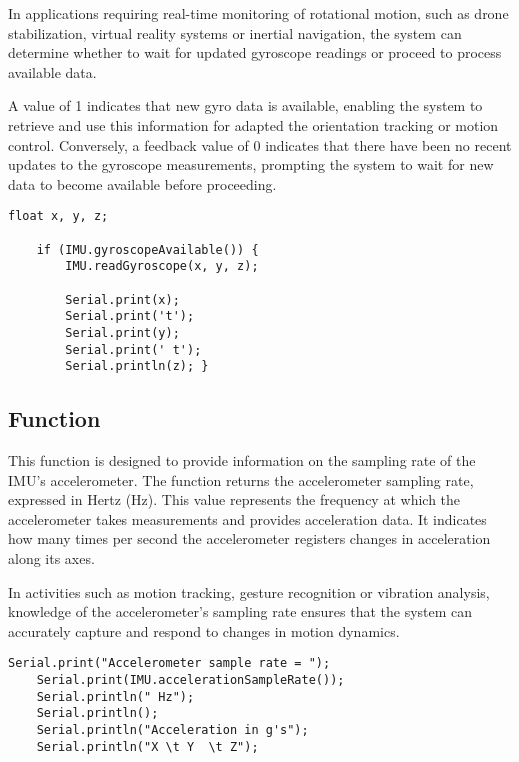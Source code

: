 In applications requiring real-time monitoring of rotational motion, such as drone stabilization, virtual reality systems or inertial navigation, the system can determine whether to wait for updated gyroscope readings or proceed to process available data.

A value of 1 indicates that new gyro data is available, enabling the system to retrieve and use this information for adapted the orientation tracking or motion control. Conversely, a feedback value of 0 indicates that there have been no recent updates to the gyroscope measurements, prompting the system to wait for new data to become available before proceeding.

\begin{lstlisting}[style=Arduino]
    float x, y, z;
    
    if (IMU.gyroscopeAvailable()) {
        IMU.readGyroscope(x, y, z);
        
        Serial.print(x);
        Serial.print('t');
        Serial.print(y);
        Serial.print(' t');
        Serial.println(z); }
\end{lstlisting}


\subsection{Function }

This function is designed to provide information on the sampling rate of the IMU's accelerometer. The function  returns the accelerometer sampling rate, expressed in Hertz (Hz). This value represents the frequency at which the accelerometer takes measurements and provides acceleration data. It indicates how many times per second the accelerometer registers changes in acceleration along its axes.

In activities such as motion tracking, gesture recognition or vibration analysis, knowledge of the accelerometer's sampling rate ensures that the system can accurately capture and respond to changes in motion dynamics. 

\begin{lstlisting}[style=Arduino]
    Serial.print("Accelerometer sample rate = ");
    Serial.print(IMU.accelerationSampleRate());
    Serial.println(" Hz");
    Serial.println();
    Serial.println("Acceleration in g's");
    Serial.println("X \t Y  \t Z");
\end{lstlisting}



